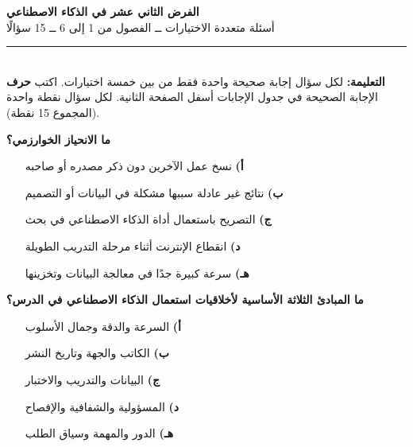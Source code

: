 \documentclass[11pt,a4paper]{article}
\begin{document}
\begin{center}
{\Large\khatt\textbf{الفرض الثاني عشر في الذكاء الاصطناعي}}\\[2pt]
{\normalsize أسئلة متعددة الاختيارات ــ الفصول من 1 إلى 6 ــ 15 سؤالًا}
\end{center}
\vspace{-4pt}\rule{\textwidth}{0.6pt}\\
{\small\textbf{التعليمة:} لكل سؤال إجابة صحيحة واحدة فقط من بين خمسة اختيارات.
اكتب \textbf{حرف} الإجابة الصحيحة في جدول الإجابات أسفل الصفحة الثانية.
لكل سؤال نقطة واحدة (المجموع 15 نقطة).}
\vspace{-2pt}
\begin{multicols}{2}

\noindent\begin{minipage}{\linewidth}
\hangindent=0.7cm\textbf{ما الانحياز الخوارزمي؟}
\begin{itemize}[leftmargin=0.95cm, labelsep=4pt, itemsep=0pt, topsep=2pt, parsep=0pt]
  \item[\textbf{أ)}] نسخ عمل الآخرين دون ذكر مصدره أو صاحبه
  \item[\textbf{ب)}] نتائج غير عادلة سببها مشكلة في البيانات أو التصميم
  \item[\textbf{ج)}] التصريح باستعمال أداة الذكاء الاصطناعي في بحث
  \item[\textbf{د)}] انقطاع الإنترنت أثناء مرحلة التدريب الطويلة
  \item[\textbf{هـ)}] سرعة كبيرة جدًا في معالجة البيانات وتخزينها
\end{itemize}
\end{minipage}\par\vspace{7pt plus 4pt}
\noindent\begin{minipage}{\linewidth}
\hangindent=0.7cm\textbf{ما المبادئ الثلاثة الأساسية لأخلاقيات استعمال الذكاء الاصطناعي في الدرس؟}
\begin{itemize}[leftmargin=0.95cm, labelsep=4pt, itemsep=0pt, topsep=2pt, parsep=0pt]
  \item[\textbf{أ)}] السرعة والدقة وجمال الأسلوب
  \item[\textbf{ب)}] الكاتب والجهة وتاريخ النشر
  \item[\textbf{ج)}] البيانات والتدريب والاختبار
  \item[\textbf{د)}] المسؤولية والشفافية والإفصاح
  \item[\textbf{هـ)}] الدور والمهمة وسياق الطلب
\end{itemize}

\end{minipage}
\end{multicols}
\end{document}

